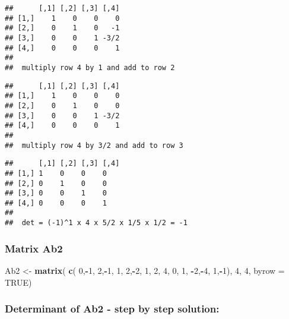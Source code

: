 \documentclass[
  10pt,
  a4paper,
]{article}
\newenvironment{Shaded}{\begin{snugshade}}{\end{snugshade}}
\newcommand{\AttributeTok}[1]{\textcolor[rgb]{0.13,0.29,0.53}{#1}}
\newcommand{\ConstantTok}[1]{\textcolor[rgb]{0.56,0.35,0.01}{#1}}
\newcommand{\DecValTok}[1]{\textcolor[rgb]{0.00,0.00,0.81}{#1}}
\newcommand{\FunctionTok}[1]{\textcolor[rgb]{0.13,0.29,0.53}{\textbf{#1}}}
\newcommand{\NormalTok}[1]{#1}
\newcommand{\OtherTok}[1]{\textcolor[rgb]{0.56,0.35,0.01}{#1}}
\newcommand{\SpecialCharTok}[1]{\textcolor[rgb]{0.81,0.36,0.00}{\textbf{#1}}}
\begin{document}
\begin{verbatim}
##      [,1] [,2] [,3] [,4]
## [1,]    1    0    0    0
## [2,]    0    1    0   -1
## [3,]    0    0    1 -3/2
## [4,]    0    0    0    1
## 
##  multiply row 4 by 1 and add to row 2
\end{verbatim}

\begin{verbatim}
##      [,1] [,2] [,3] [,4]
## [1,]    1    0    0    0
## [2,]    0    1    0    0
## [3,]    0    0    1 -3/2
## [4,]    0    0    0    1
## 
##  multiply row 4 by 3/2 and add to row 3
\end{verbatim}

\begin{verbatim}
##      [,1] [,2] [,3] [,4]
## [1,] 1    0    0    0   
## [2,] 0    1    0    0   
## [3,] 0    0    1    0   
## [4,] 0    0    0    1   
## 
##  det = (-1)^1 x 4 x 5/2 x 1/5 x 1/2 = -1
\end{verbatim}

\hypertarget{matrix-ab2}{%
\subsubsection{Matrix Ab2}\label{matrix-ab2}}

\begin{Shaded}
\begin{Highlighting}[]
\NormalTok{Ab2 }\OtherTok{\textless{}{-}} \FunctionTok{matrix}\NormalTok{(}
        \FunctionTok{c}\NormalTok{( }\DecValTok{0}\NormalTok{,}\SpecialCharTok{{-}}\DecValTok{1}\NormalTok{, }\DecValTok{2}\NormalTok{,}\SpecialCharTok{{-}}\DecValTok{1}\NormalTok{,}
           \DecValTok{1}\NormalTok{, }\DecValTok{2}\NormalTok{,}\SpecialCharTok{{-}}\DecValTok{2}\NormalTok{, }\DecValTok{1}\NormalTok{,}
           \DecValTok{2}\NormalTok{, }\DecValTok{4}\NormalTok{, }\DecValTok{0}\NormalTok{, }\DecValTok{1}\NormalTok{,}
          \SpecialCharTok{{-}}\DecValTok{2}\NormalTok{,}\SpecialCharTok{{-}}\DecValTok{4}\NormalTok{, }\DecValTok{1}\NormalTok{,}\SpecialCharTok{{-}}\DecValTok{1}\NormalTok{), }\DecValTok{4}\NormalTok{, }\DecValTok{4}\NormalTok{, }\AttributeTok{byrow =} \ConstantTok{TRUE}\NormalTok{)}
\end{Highlighting}
\end{Shaded}

\hypertarget{determinant-of-ab2---step-by-step-solution}{%
\subsubsection{Determinant of Ab2 - step by step
solution:}\label{determinant-of-ab2---step-by-step-solution}}
\end{document}
